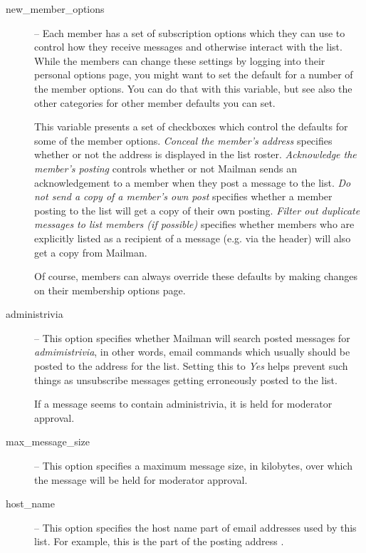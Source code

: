 \documentclass{howto}
\begin{document}
\begin{description}
\item[new_member_options] --
    Each member has a set of subscription options which they can use
    to control how they receive messages and otherwise interact with
    the list.  While the members can change these settings by logging
    into their personal options page, you might want to set the
    default for a number of the member options.  You can do that with
    this variable, but see also the other categories for other member
    defaults you can set.

    This variable presents a set of checkboxes which control the
    defaults for some of the member options.  \emph{Conceal the
    member's address} specifies whether or not the address is
    displayed in the list roster.  \emph{Acknowledge the member's
    posting} controls whether or not Mailman sends an acknowledgement
    to a member when they post a message to the list.  \emph{Do not
    send a copy of a member's own post} specifies whether a member
    posting to the list will get a copy of their own posting.
    \emph{Filter out duplicate messages to list members (if possible)}
    specifies whether members who are explicitly listed as a recipient
    of a message (e.g. via the  header) will also get a
    copy from Mailman.

    Of course, members can always override these defaults by making
    changes on their membership options page.

\item[administrivia] --
    This option specifies whether Mailman will search posted messages
    for \emph{admimistrivia}, in other words, email commands which
    usually should be posted to the  address for the
    list.  Setting this to \emph{Yes} helps prevent such things as
    unsubscribe messages getting erroneously posted to the list.

    If a message seems to contain administrivia, it is held for
    moderator approval.

\item[max_message_size] --
    This option specifies a maximum message size, in kilobytes, over
    which the message will be held for moderator approval.

\item[host_name] --
    This option specifies the host name part of email addresses used
    by this list.  For example, this is the  part of
    the posting address .


\end{description}
\end{document}
